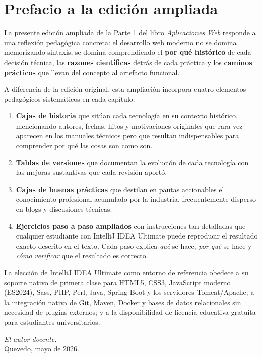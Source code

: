\documentclass[11pt,a4paper,openany]{book}
\begin{document}
\chapter*{Prefacio a la edición ampliada}

La presente edición ampliada de la Parte 1 del libro \emph{Aplicaciones
Web} responde a una reflexión pedagógica concreta: el desarrollo web
moderno no se domina memorizando sintaxis, se domina comprendiendo el
\textbf{por qué histórico} de cada decisión técnica, las
\textbf{razones científicas} detrás de cada práctica y los
\textbf{caminos prácticos} que llevan del concepto al artefacto
funcional.

A diferencia de la edición original, esta ampliación incorpora cuatro
elementos pedagógicos sistemáticos en cada capítulo:

\begin{enumerate}
\item \textbf{Cajas de historia} que sitúan cada tecnología en su
contexto histórico, mencionando autores, fechas, hitos y motivaciones
originales que rara vez aparecen en los manuales técnicos pero que
resultan indispensables para comprender por qué las cosas son como son.
\item \textbf{Tablas de versiones} que documentan la evolución de cada
tecnología con las mejoras sustantivas que cada revisión aportó.
\item \textbf{Cajas de buenas prácticas} que destilan en pautas
accionables el conocimiento profesional acumulado por la industria,
frecuentemente disperso en blogs y discusiones técnicas.
\item \textbf{Ejercicios paso a paso ampliados} con instrucciones tan
detalladas que cualquier estudiante con IntelliJ IDEA Ultimate puede
reproducir el resultado exacto descrito en el texto. Cada paso explica
\emph{qué} se hace, \emph{por qué} se hace y \emph{cómo verificar} que
el resultado es correcto.
\end{enumerate}

La elección de IntelliJ IDEA Ultimate como entorno de referencia
obedece a su soporte nativo de primera clase para HTML5, CSS3,
JavaScript moderno (ES2024), Sass, PHP, Perl, Java, Spring Boot y los
servidores Tomcat/Apache; a la integración nativa de Git, Maven,
Docker y bases de datos relacionales sin necesidad de plugins externos;
y a la disponibilidad de licencia educativa gratuita para estudiantes
universitarios.

\hfill\textit{El autor docente.}\\
\hfill Quevedo, mayo de 2026.
\end{document}
